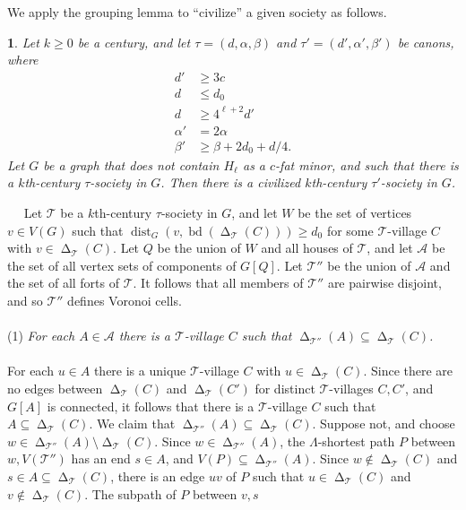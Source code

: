 \documentclass[titlepage,11pt]{article}
\newcommand{\dist}{\operatorname{dist}}
\newcommand{\voro}{\operatorname{\Delta}}
\newcommand{\bd}{\operatorname{bd}}
\newcommand{\mac}{\mathcal}
\newtheorem{thm}{}[section]
\newcommand{\Proof}{\noindent{\bf Proof.}\ \ }
\begin{document}
	
	We apply the grouping lemma to ``civilize'' a given society as follows. 
	\begin{thm}\label{newbestsoc}
		Let $k\ge 0$ be a century, and let $\tau=(d,\alpha,\beta)$ and $\tau'=(d', \alpha', \beta')$ be canons,
		where 
		\begin{align*}
			d'&\ge 3c\\
			d&\le d_0\\
			d&\ge 4^{\ell+2} d'\\
			\alpha'&= 2\alpha\\
			\beta' &\ge  \beta +2d_0+d/4.
		\end{align*}
		Let $G$ be a graph that does not contain $H_\ell$ as a $c$-fat minor, and such that there is a $k$th-century
		$\tau$-society in $G$. Then there is a civilized
		$k$th-century $\tau'$-society in $G$.
	\end{thm}
	\Proof
	Let $\mac T$ be a $k$th-century $\tau$-society in $G$, and let $W$ be the set of vertices $v\in V(G)$ such that 
	$\dist_G(v,\bd(\voro_{\mac T}(C)))\ge d_0$
	for some $\mac T$-village $C$ with $v\in \voro_{\mac T}(C)$.
	Let $Q$ be the union of $W$ and all houses of $\mac T$, and let $\mac A$ be the set of all
	vertex sets of components of $G[Q]$. Let $\mac T''$ be the union of $\mac A$ and the set of all forts of $\mac T$. It follows that all 
	members of $\mac T''$ are pairwise disjoint, and so $\mac T''$ defines Voronoi cells.
	\\
	\\
	(1) {\em For each $A\in \mac A$ there is a $\mac T$-village $C$ such that $\voro_{\mac T''}(A)\subseteq \voro_{\mac T}(C)$.}
	\\
	\\
	For each $u\in A$ there is a unique $\mac T$-village $C$ with $u\in \voro_{\mac T}(C)$. Since there are no edges between $\voro_{\mac T}(C)$ and $\voro_{\mac T}(C')$
	for distinct $\mac T$-villages $C,C'$, and $G[A]$ is connected, it follows that there is a $\mac T$-village $C$ such that
	$A\subseteq \voro_{\mac T}(C)$.
	We claim that $\voro_{\mac T''}(A)\subseteq \voro_{\mac T}(C)$. Suppose not, and choose 
	$w\in \voro_{\mac T''}(A)\setminus \voro_{\mac T}(C)$. Since $w\in \voro_{\mac T''}(A)$, the $\Lambda$-shortest path $P$ between 
	$w, V(\mac T'')$ has an end $s\in A$, and $V(P)\subseteq \voro_{\mac T''}(A)$. Since $w\notin  \voro_{\mac T}(C)$ and $s\in A\subseteq \voro_{\mac T}(C)$, 
	there is an edge $uv$ of $P$ such that $u\in \voro_{\mac T}(C)$ and $v\notin \voro_{\mac T}(C)$. The subpath of $P$ between $v,s$
\end{document}
